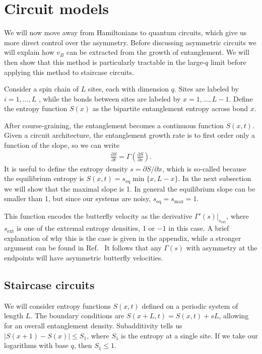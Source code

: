 \documentclass[aps,prx,reprint,superscriptaddress, longbibliography]{revtex4-1}
\begin{document}
\section{Circuit models} \label{sec:circ}

We will now move away from Hamiltonians to quantum circuits, which give us more direct control over the asymmetry. 
Before discussing asymmetric circuits we will explain how $v_B$ can be extracted from the growth of entanglement. We will then show that this method is particularly tractable in the large-$q$ limit before applying this method to staircase circuits. 

Consider a spin chain of $L$ sites, each with dimension $q$. Sites are labeled by $i = 1,\dots, L$ , while the bonds between sites are labeled by $x = 1, \dots, L - 1$. Define the entropy function $S(x)$ as the bipartite entanglement entropy across bond $x$. 

After course-graining, the entanglement becomes a continuous function $S(x,t)$. Given a circuit architecture, the entanglement growth rate is to first order only a function of the slope, so we can write \cite{Jonay}
\begin{align}
\frac{\partial S}{\partial t} = \Gamma\left(\frac{\partial S}{\partial x}\right).
\end{align}
It is useful to define the entropy density $s = \partial S / \partial x$, which is so-called because the equilibrium entropy is $S(x, t) = s_\text{eq} \min\{x, L - x\}$.  In the next subsection we will show that the maximal slope is 1. In general the equilibrium slope can be smaller than 1, but since our systems are noisy, $s_\text{eq} = s_\text{max} = 1$.

This function encodes the butterfly velocity as the derivative $\Gamma'(s)|_{s_\text{ext}}$, where $s_\text{ext}$ is one of the extremal entropy densities, 1 or $-1$ in this case. A brief explanation of why this is the case is given in the appendix, while a stronger argument can be found in Ref.~\cite{Jonay}
It follows that any $\Gamma(s)$ with asymmetry at the endpoints will have asymmetric butterfly velocities.

\subsection{Staircase circuits}

We will consider entropy functions $S(x,t)$ defined on a periodic system of length $L$. The boundary conditions are $S(x+L,t) = S(x,t)+sL$, allowing for an overall entanglement density.
Subadditivity tells us $|S(x + 1) - S(x)| \le S_1$, where $S_1$ is the entropy at a single site. If we take our logarithms with base $q$, then $S_1 \le 1$.
\end{document}
